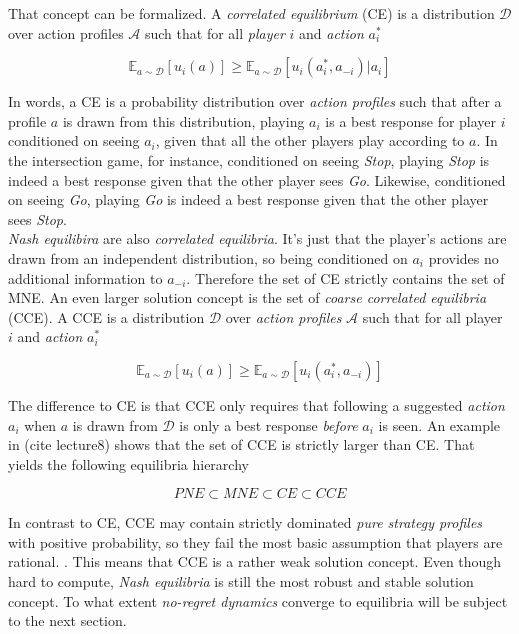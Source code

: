 That concept can be formalized. A \textit{correlated equilibrium} (CE) is a distribution $\mathcal{D}$ over action profiles $\mathcal{A}$ such that for all \textit{player} $i$ and \textit{action} $a_{i}^{*}$

\begin{equation*}
    \mathbb{E}_{a \sim \mathcal{D}}[u_i(a)] \ge \mathbb{E}_{a \sim \mathcal{D}}[u_i(a_{i}^{*},a_{-i})|a_i]
\end{equation*}

In words, a CE is a probability distribution over \textit{action profiles} such that after a profile $a$ is drawn from this distribution, playing $a_i$ is a best response for player $i$ conditioned on seeing $a_i$, given that all the other players play according to $a$. In the intersection game, for instance, conditioned on seeing \textit{Stop}, playing \textit{Stop} is indeed a best response given that the other player sees \textit{Go}. Likewise, conditioned on seeing \textit{Go}, playing \textit{Go} is indeed a best response given that the other player sees \textit{Stop}. \\

\textit{Nash equilibira} are also \textit{correlated equilibria}. It's just that the player's actions are drawn from an independent distribution, so being conditioned on $a_i$ provides no additional information to $a_{-i}$. Therefore the set of CE strictly contains the set of MNE. An even larger solution concept is the set of \textit{coarse correlated equilibria} (CCE). A CCE is a distribution $\mathcal{D}$ over \textit{action profiles} $\mathcal{A}$ such that for all player $i$ and \textit{action} $a_{i}^{*}$

\begin{equation*}
    \mathbb{E}_{a \sim \mathcal{D}}[u_i(a)] \ge \mathbb{E}_{a \sim \mathcal{D}}[u_i(a_{i}^{*},a_{-i})]
\end{equation*}

The difference to CE is that CCE only requires that following a suggested \textit{action} $a_i$ when $a$ is drawn from $\mathcal{D}$ is only a best response \textit{before} $a_i$ is seen. An example in (cite lecture8) shows that the set of CCE is strictly larger than CE. That yields the following equilibria hierarchy

\begin{equation*}
    PNE \subset MNE \subset CE \subset CCE
\end{equation*}

In contrast to CE, CCE may contain strictly dominated \textit{pure strategy profiles} with positive probability, so they fail the most basic assumption that players are rational. \cite{viossat}. This means that CCE is a rather weak solution concept. Even though hard to compute, \textit{Nash equilibria} is still the most robust and stable solution concept. To what extent \textit{no-regret dynamics} converge to equilibria will be subject to the next section. 


